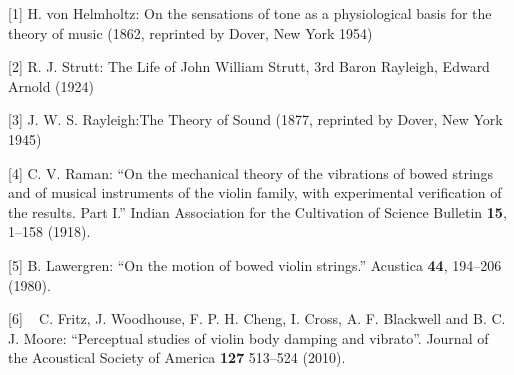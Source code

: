   \sectionreferences{}[1] H. von Helmholtz: On the sensations of tone as a 
  physiological basis for the theory of music (1862, reprinted by Dover, New 
  York 1954) 

  [2] R. J. Strutt: The Life of John William Strutt, 3rd Baron Rayleigh, Edward 
  Arnold (1924) 

  [3] J. W. S. Rayleigh:The Theory of Sound (1877, reprinted by Dover, New York 
  1945) 

  [4] C. V. Raman: ``On the mechanical theory of the vibrations of bowed 
  strings and of musical instruments of the violin family, with experimental 
  verification of the results. Part I.'' Indian Association for the Cultivation 
  of Science Bulletin \textbf{15}, 1–158 (1918). 

  [5] B. Lawergren: ``On the motion of bowed violin strings.'' Acustica 
  \textbf{44}, 194–206 (1980). 

  [6] ~ C. Fritz, J. Woodhouse, F. P. H. Cheng, I. Cross, A. F. Blackwell and 
  B. C. J. Moore: ``Perceptual studies of violin body damping and vibrato''. 
  Journal of the Acoustical Society of America \textbf{127} 513--524 (2010). 